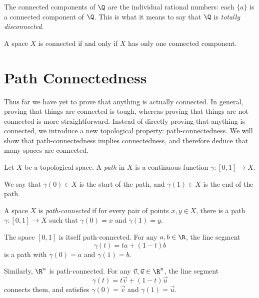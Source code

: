 \documentclass[noname]{notes}
\begin{document}
\begin{example}
	The connected components of $\Q$ are the individual rational numbers: each $\{a\}$ is a connected component of $\Q$. This is what it means to say that $\Q$ is \emph{totally disconnected}. 
\end{example}

\begin{remark}
	A space $X$ is connected if and only if $X$ has only one connected component. 
\end{remark}

\section{Path Connectedness}

Thus far we have yet to prove that anything is actually connected. In general, proving that things are connected is tough, whereas proving that things are not connected is more straightforward. Instead of directly proving that anything is connected, we introduce a new topological property: path-connectedness. We will show that path-connectedness implies connectedness, and therefore deduce that many spaces are connected. 

\begin{definition}
	Let $X$ be a topological space. A \emph{path} in $X$ is a continuous function $\gamma \colon [0,1] \to X$. 
\end{definition}

We say that $\gamma(0) \in X$ is the start of the path, and $\gamma(1) \in X$ is the end of the path. 

\begin{definition}
	A space $X$ is \emph{path-connected} if for every pair of points $x, y \in X$, there is a path $\gamma \colon [0,1] \to X$ such that $\gamma(0) = x$ and $\gamma(1) = y$. 
\end{definition}

\begin{example}
	The space $[0,1]$ is itself path-connected. For any $a, b\in \R$, the line segment 
	\[
		\gamma(t) = ta + (1-t)b
	\]
	is a path with $\gamma(0) = a$ and $\gamma(1) = b$. 
\end{example}

\begin{example}
	Similarly, $\R^n$ is path-connected. For any $\vec v, \vec u \in \R^n$, the line segment 
	\[
		\gamma(t) = t\vec v + (1-t) \vec u
	\]
	connects them, and satisfies $\gamma(0) = \vec v$ and $\gamma(1) = \vec u$. 
\end{example}
\end{document}
